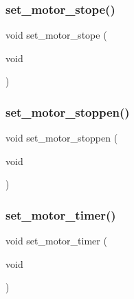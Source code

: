\subsubsection{set\+\_\+motor\+\_\+stope()}
{\footnotesize\ttfamily void set\+\_\+motor\+\_\+stope (\begin{DoxyParamCaption}\item[{void}]{ }\end{DoxyParamCaption})}

\mbox{\label{motor_8h_ae5804ba279c1f4fd7eaf106241ef511a}} 
\subsubsection{set\+\_\+motor\+\_\+stoppen()}
{\footnotesize\ttfamily void set\+\_\+motor\+\_\+stoppen (\begin{DoxyParamCaption}\item[{void}]{ }\end{DoxyParamCaption})}

\mbox{\label{motor_8h_aed47fedb52bc983157fd3657efcbd9bc}} 
\subsubsection{set\+\_\+motor\+\_\+timer()}
{\footnotesize\ttfamily void set\+\_\+motor\+\_\+timer (\begin{DoxyParamCaption}\item[{void}]{ }\end{DoxyParamCaption})}

